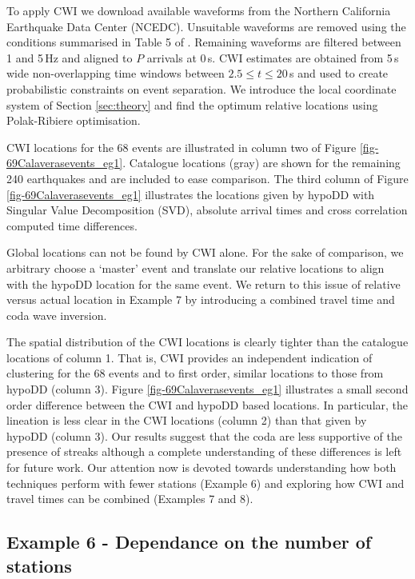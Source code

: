 \documentclass[extra]{gji}
\begin{document}
To apply CWI we download available waveforms
from the Northern California Earthquake Data Center
(NCEDC). Unsuitable waveforms are removed
using the conditions summarised in Table 5 of
\citet{dr_Robinson11a}. Remaining waveforms are filtered between
1 and 5\,Hz and aligned  to $P$ arrivals at 0\,s. CWI estimates are
obtained from 5\,s wide non-overlapping time windows between $2.5
\leq t \leq 20$\,s and used to create probabilistic constraints on
event separation. We introduce the local coordinate system of
Section \ref{sec:theory} and find the optimum relative locations using
Polak-Ribiere optimisation.

CWI locations for the 68 events are illustrated in column two of
Figure \ref{fig-69Calaverasevents_eg1}. Catalogue locations (gray)
are shown for the remaining 240 earthquakes and are included to ease
comparison. The third column of Figure
\ref{fig-69Calaverasevents_eg1} illustrates the locations given by
hypoDD with Singular Value Decomposition (SVD), absolute arrival
times and cross correlation computed time differences.

Global locations can not be found by CWI alone.
For the sake of comparison, we arbitrary choose a
`master' event and translate our relative locations to align with the hypoDD
location for the same event. We return to this issue of relative
versus actual location in Example 7 by introducing a combined travel
time and coda wave inversion.

The spatial distribution of the CWI locations is clearly tighter
than the catalogue locations of column 1. That is, CWI provides an
independent indication of clustering for the 68 events and to first
order, similar locations to those from hypoDD (column 3). Figure
\ref{fig-69Calaverasevents_eg1}
illustrates a small second order difference between
the CWI and hypoDD based locations. In particular, the lineation is
less clear in the CWI locations (column 2) than that given by
hypoDD (column 3). Our results suggest that the coda are less
supportive of the presence of streaks although a complete
understanding of these differences is left for future work. Our
attention now is devoted towards understanding how both techniques
perform with fewer stations (Example 6) and exploring how CWI and
travel times can be combined (Examples 7 and 8).


\subsection{Example 6 - Dependance on the number of stations}
\end{document}
